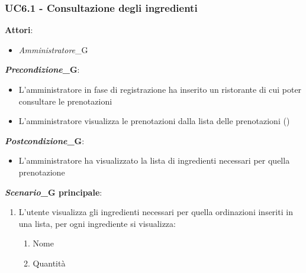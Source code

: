 \subsubsection{UC6.1 - Consultazione degli ingredienti}\label{usecase:6_1}
\textbf{Attori}:
\begin{itemize}
    \item \textit{Amministratore}_G
\end{itemize}
\textbf{\textit{Precondizione}_G}:
\begin{itemize}
    \item L'amministratore in fase di registrazione ha inserito un ristorante di cui poter consultare le prenotazioni
    \item L'amministratore visualizza le prenotazioni dalla lista delle prenotazioni ()
\end{itemize}
\textbf{\textit{Postcondizione}_G}:
\begin{itemize}
    \item L'amministratore ha visualizzato la lista di ingredienti necessari per quella prenotazione
\end{itemize}
\textbf{\textit{Scenario}_G principale}:
\begin{enumerate}
    \item L'utente visualizza gli ingredienti necessari per quella ordinazioni inseriti in una lista, per ogni ingrediente si visualizza:
    \begin{enumerate}
        \item Nome
        \item Quantità
    \end{enumerate}
\end{enumerate}